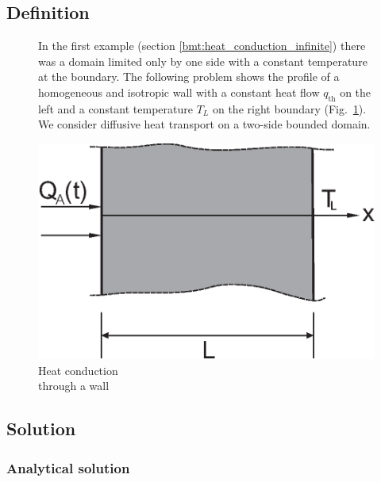 \subsection{Definition}
\bigskip
\begin{figure}[!htb]
\begin{minipage}[t]{0.48\textwidth}
\vspace{-3cm}
In the first example (section \ref{bmt:heat_conduction_infinite}) there was a domain limited only by one side with a constant temperature at the boundary. The following problem shows the profile of a homogeneous and isotropic wall with a constant heat flow $q_{\mathrm{th}}$ on the left and a constant temperature $T_L$ on the right boundary (Fig.~\ref{fig-lhdw}). We consider diffusive heat transport on a two-side bounded domain.
\end{minipage}
\hspace{0.02\textwidth}
\begin{minipage}[t]{0.48\textwidth}
\centering
\includegraphics[scale=0.33]{PART_II/T/LHDW.eps}
\caption{\label{fig-lhdw}Heat conduction\\ through a wall}
\end{minipage}
\end{figure}

\vspace{-0.5cm}
\subsection{Solution}
\subsubsection{Analytical solution}

